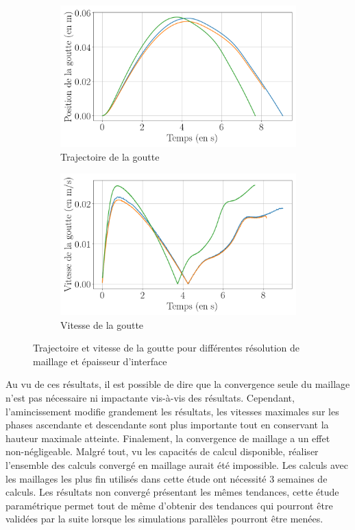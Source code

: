 \begin{figure}[H] 
	\centering
	\begin{subfigure}[H]{0.47\textwidth}
		\centering
		\includegraphics[width=\textwidth]{figure/influence_maillage_position.png}
		\caption{Trajectoire de la goutte}
	\end{subfigure} 
	\begin{subfigure}[H]{0.47\textwidth}
		\centering
		\includegraphics[width=\textwidth]{figure/influence_maillage_vitesse.png}
		\caption{Vitesse de la goutte}
	\end{subfigure}
	\caption{Trajectoire et vitesse de la goutte pour différentes résolution de maillage et épaisseur d'interface}
\label{fig:impactmesh}
\end{figure}
Au vu de ces résultats, il est possible de dire que la convergence seule du maillage n'est pas nécessaire ni impactante vis-à-vis des résultats. Cependant, l'amincissement modifie grandement les résultats, les vitesses maximales sur les phases ascendante et descendante sont plus importante tout en conservant la hauteur maximale atteinte. Finalement, la convergence de maillage a un effet non-négligeable. Malgré tout, vu les capacités de calcul disponible, réaliser l'ensemble des calculs convergé en maillage aurait été impossible. Les calculs avec les maillages les plus fin utilisés dans cette étude ont nécessité 3 semaines de calculs. Les résultats non convergé présentant les mêmes tendances, cette étude paramétrique permet tout de même d'obtenir des tendances qui pourront être validées par la suite lorsque les simulations parallèles pourront être menées.

